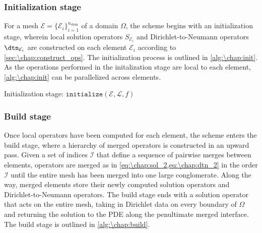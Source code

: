\subsubsection{Initialization stage}\label{sec:\chap:ultra_hps:init}
For a mesh $\mathcal{E} = \{\mathcal{E}_i\}_{i=1}^{n_\text{elem}}$ of a domain $\Omega$, the scheme begins with an initialization stage, wherein local solution operators $S_{\mathcal{E}_i}$ and Dirichlet-to-Neumann operators $\dtn_{\mathcal{E}_i}$ are constructed on each element $\mathcal{E}_i$ according to \cref{sec:\chap:construct_ops}. The initialization process is outlined in \cref{alg:\chap:init}. As the operations performed in the initalization stage are local to each element, \cref{alg:\chap:init} can be parallelized across elements.

\begin{algorithm}[htb]
\caption{Initialization stage: $\texttt{initialize}(\mathcal{E}, \mathcal{L}, f)$}
\begin{algorithmic}[1]
\EndFor
\end{algorithmic}
\label{alg:\chap:init}
\end{algorithm}

\subsubsection{Build stage}\label{sec:\chap:ultra_hps:build}
Once local operators have been computed for each element, the scheme enters the build stage, where a hierarchy of merged operators is constructed in an upward pass. Given a set of indices $\mathcal{I}$ that define a sequence of pairwise merges between elements, operators are merged as in \cref{eq:\chap:sol_2,eq:\chap:dtn_2} in the order $\mathcal{I}$ until the entire mesh has been merged into one large conglomerate. Along the way, merged elements store their newly computed solution operators and Dirichlet-to-Neumann operators. The build stage ends with a solution operator that acts on the entire mesh, taking in Dirichlet data on every boundary of $\Omega$ and returning the solution to the PDE along the penultimate merged interface. The build stage is outlined in \cref{alg:\chap:build}.


